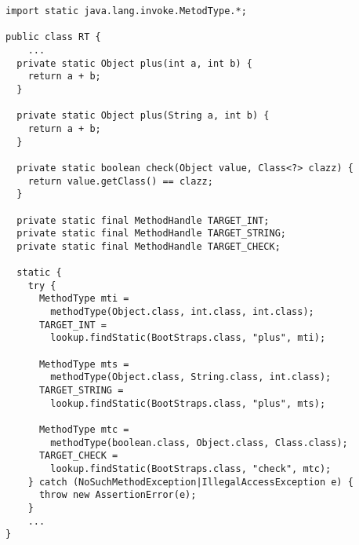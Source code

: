 {\scriptsize \begin{verbatim}
import static java.lang.invoke.MetodType.*;

public class RT {
    ...
  private static Object plus(int a, int b) {
    return a + b;
  }

  private static Object plus(String a, int b) {
    return a + b;
  }

  private static boolean check(Object value, Class<?> clazz) {
    return value.getClass() == clazz;
  }

  private static final MethodHandle TARGET_INT;
  private static final MethodHandle TARGET_STRING;
  private static final MethodHandle TARGET_CHECK;

  static {
    try {
      MethodType mti =
        methodType(Object.class, int.class, int.class);
      TARGET_INT =
        lookup.findStatic(BootStraps.class, "plus", mti);

      MethodType mts =
        methodType(Object.class, String.class, int.class);
      TARGET_STRING =
        lookup.findStatic(BootStraps.class, "plus", mts);

      MethodType mtc =
        methodType(boolean.class, Object.class, Class.class);
      TARGET_CHECK =
        lookup.findStatic(BootStraps.class, "check", mtc);
    } catch (NoSuchMethodException|IllegalAccessException e) {
      throw new AssertionError(e);
    }
    ...
}
\end{verbatim} }
